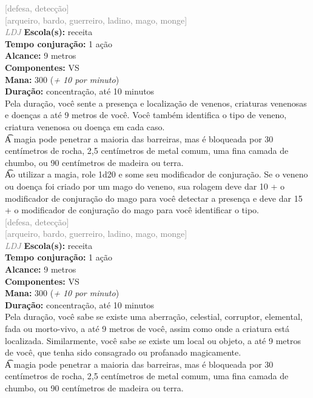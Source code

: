 \documentclass{RPG_Adventure}[2021/10/20]
\begin{document}
{\scriptsize \textcolor{gray}{[defesa, detecção]\\}}
{\scriptsize \textcolor{gray}{[arqueiro, bardo, guerreiro, ladino, mago, monge]\\}}
{\tiny \textcolor{gray}{\textit{LDJ}}}\jump{}
{\small \t \textbf{Escola(s):} receita\\\t \textbf{Tempo conjuração:} 1 ação\\\t \textbf{Alcance:} 9 metros\\\t \textbf{Componentes:} VS\\\t \textbf{Mana:} 300 (\textit{+ 10 por minuto})\\\t \textbf{Duração:} concentração, até 10 minutos\\}
{\normalsize Pela duração, você sente a presença e localização de venenos, criaturas venenosas e doenças a até 9 metros de você. Você também identifica o tipo de veneno, criatura venenosa ou doença em cada caso.\\\t A magia pode penetrar a maioria das barreiras, mas é bloqueada por 30 centímetros de rocha, 2,5 centímetros de metal comum, uma fina camada de chumbo, ou 90 centímetros de madeira ou terra.\\\t Ao utilizar a magia, role 1d20 e some seu modificador de conjuração. Se o veneno ou doença foi criado por um mago do veneno, sua rolagem deve dar 10 + o modificador de conjuração do mago para você detectar a presença e deve dar 15 + o modificador de conjuração do mago para você identificar o tipo.\\}
{\scriptsize \textcolor{gray}{[defesa, detecção]\\}}
{\scriptsize \textcolor{gray}{[arqueiro, bardo, guerreiro, ladino, mago, monge]\\}}
{\tiny \textcolor{gray}{\textit{LDJ}}}\jump{}
{\small \t \textbf{Escola(s):} receita\\\t \textbf{Tempo conjuração:} 1 ação\\\t \textbf{Alcance:} 9 metros\\\t \textbf{Componentes:} VS\\\t \textbf{Mana:} 300 (\textit{+ 10 por minuto})\\\t \textbf{Duração:} concentração, até 10 minutos\\}
{\normalsize Pela duração, você sabe se existe uma aberração, celestial, corruptor, elemental, fada ou morto-vivo, a até 9 metros de você, assim como onde a criatura está localizada. Similarmente, você sabe se existe um local ou objeto, a até 9 metros de você, que tenha sido consagrado ou profanado magicamente.\\\t A magia pode penetrar a maioria das barreiras, mas é bloqueada por 30 centímetros de rocha, 2,5 centímetros de metal comum, uma fina camada de chumbo, ou 90 centímetros de madeira ou terra.\\}
\end{document}
